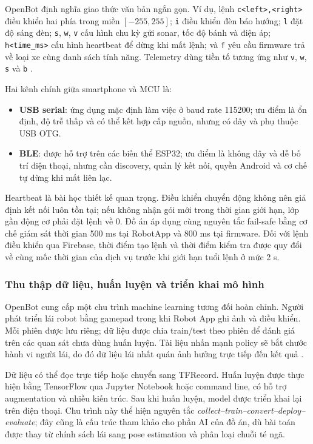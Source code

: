OpenBot định nghĩa giao thức văn bản ngắn gọn. Ví dụ, lệnh \texttt{c<left>,<right>} điều khiển hai phía trong miền $[-255,255]$; \texttt{i} điều khiển đèn báo hướng; \texttt{l} đặt độ sáng đèn; \texttt{s}, \texttt{w}, \texttt{v} cấu hình chu kỳ gửi sonar, tốc độ bánh và điện áp; \texttt{h<time\_ms>} cấu hình heartbeat để dừng khi mất lệnh; và \texttt{f} yêu cầu firmware trả về loại xe cùng danh sách tính năng. Telemetry dùng tiền tố tương ứng như \texttt{v}, \texttt{w}, \texttt{s} và \texttt{b} .

Hai kênh chính giữa smartphone và MCU là:

\begin{itemize}
    \item \textbf{USB serial}: ứng dụng mặc định làm việc ở baud rate 115200; ưu điểm là ổn định, độ trễ thấp và có thể kết hợp cấp nguồn, nhưng có dây và phụ thuộc USB OTG.
    \item \textbf{BLE}: được hỗ trợ trên các biến thể ESP32; ưu điểm là không dây và dễ bố trí điện thoại, nhưng cần discovery, quản lý kết nối, quyền Android và cơ chế tự dừng khi mất liên lạc.
\end{itemize}

Heartbeat là bài học thiết kế quan trọng. Điều khiển chuyển động không nên giả định kết nối luôn tồn tại; nếu không nhận gói mới trong thời gian giới hạn, lớp gần động cơ phải đặt lệnh về 0. Đồ án áp dụng cùng nguyên tắc fail-safe bằng cơ chế giám sát thời gian 500 ms tại RobotApp và 800 ms tại firmware. Đối với lệnh điều khiển qua Firebase, thời điểm tạo lệnh và thời điểm kiểm tra được quy đổi về cùng mốc thời gian của dịch vụ trước khi giới hạn tuổi lệnh ở mức 2 s.

\subsubsection{Thu thập dữ liệu, huấn luyện và triển khai mô hình}

OpenBot cung cấp một chu trình machine learning tương đối hoàn chỉnh. Người phát triển lái robot bằng gamepad trong khi Robot App ghi ảnh và điều khiển. Mỗi phiên được lưu riêng; dữ liệu được chia train/test theo phiên để đánh giá trên các quan sát chưa dùng huấn luyện. Tài liệu nhấn mạnh policy sẽ bắt chước hành vi người lái, do đó dữ liệu lái nhất quán ảnh hưởng trực tiếp đến kết quả .

Dữ liệu có thể đọc trực tiếp hoặc chuyển sang TFRecord. Huấn luyện được thực hiện bằng TensorFlow qua Jupyter Notebook hoặc command line, có hỗ trợ augmentation và nhiều kiến trúc. Sau khi huấn luyện, model được triển khai lại trên điện thoại. Chu trình này thể hiện nguyên tắc \textit{collect--train--convert--deploy--evaluate}; đây cũng là cấu trúc tham khảo cho phần AI của đồ án, dù bài toán được thay từ chính sách lái sang pose estimation và phân loại chuỗi té ngã.

